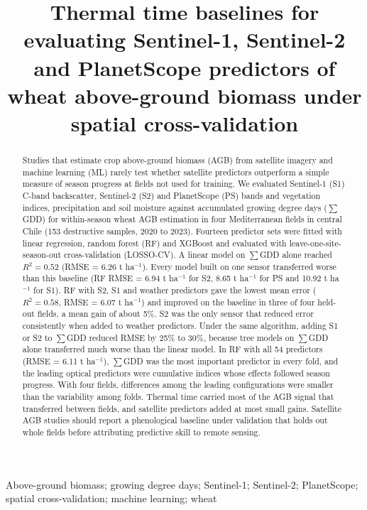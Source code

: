
\title{Thermal time baselines for evaluating Sentinel-1, Sentinel-2 and PlanetScope predictors of wheat above-ground biomass under spatial cross-validation}

\author{
}

\maketitle

\begin{abstract}
Studies that estimate crop above-ground biomass (AGB) from satellite imagery and machine learning (ML) rarely test whether satellite predictors outperform a simple measure of season progress at fields not used for training. We evaluated Sentinel-1 (S1) C-band backscatter, Sentinel-2 (S2) and PlanetScope (PS) bands and vegetation indices, precipitation and soil moisture against accumulated growing degree days ($\sum$GDD) for within-season wheat AGB estimation in four Mediterranean fields in central Chile (153 destructive samples, 2020 to 2023). Fourteen predictor sets were fitted with linear regression, random forest (RF) and XGBoost and evaluated with leave-one-site-season-out cross-validation (LOSSO-CV). A linear model on $\sum$GDD alone reached $R^2 = 0.52$ (RMSE = 6.26 t ha$^{-1}$). Every model built on one sensor transferred worse than this baseline (RF RMSE = 6.94 t ha$^{-1}$ for S2, 8.65 t ha$^{-1}$ for PS and 10.92 t ha$^{-1}$ for S1). RF with S2, S1 and weather predictors gave the lowest mean error ($R^2 = 0.58$, RMSE = 6.07 t ha$^{-1}$) and improved on the baseline in three of four held-out fields, a mean gain of about 5\%. S2 was the only sensor that reduced error consistently when added to weather predictors. Under the same algorithm, adding S1 or S2 to $\sum$GDD reduced RMSE by 25\% to 30\%, because tree models on $\sum$GDD alone transferred much worse than the linear model. In RF with all 54 predictors (RMSE = 6.11 t ha$^{-1}$), $\sum$GDD was the most important predictor in every fold, and the leading optical predictors were cumulative indices whose effects followed season progress. With four fields, differences among the leading configurations were smaller than the variability among folds. Thermal time carried most of the AGB signal that transferred between fields, and satellite predictors added at most small gains. Satellite AGB studies should report a phenological baseline under validation that holds out whole fields before attributing predictive skill to remote sensing.
\end{abstract}

\begin{keywords}
Above-ground biomass; growing degree days; Sentinel-1; Sentinel-2; PlanetScope; spatial cross-validation; machine learning; wheat
\end{keywords}
